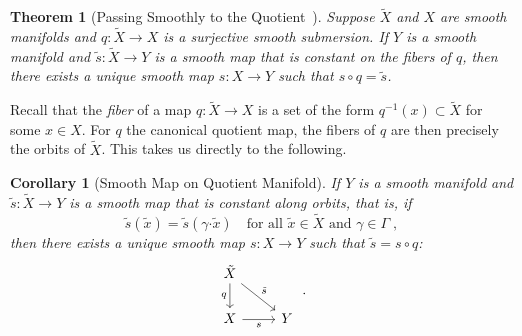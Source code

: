 \documentclass{article}
\newtheorem{corollary}{Corollary}
\newtheorem{theorem}{Theorem}
\theoremstyle{definition}
\theoremstyle{remark}
\newcommand{\bscdot}{\boldsymbol{\cdot}}
\newcommand{\DI}{\tilde{X}}	%
\newcommand{\di}{\tilde{x}}	%
\newcommand{\MA}{X}	%
\newcommand{\MAp}{Y}	%
\begin{document}
\begin{theorem}[Passing Smoothly to the Quotient~\cite{lee}] \label{thm:passing}
 Suppose $\DI$ and $\MA$ are smooth manifolds and $q : \DI \to \MA$ is a surjective smooth submersion. If $\MAp$ is a smooth
 manifold and $\tilde{s} : \DI \to \MAp$ is a smooth map that is constant on the fibers of $q$, then there exists
a unique smooth map $s : \MA \to \MAp$ such that $s\circ q = \tilde{s}$.
\end{theorem}




Recall that the \emph{fiber} of a map $q : \DI \to \MA$ is a set of the form $q^{-1}(x) \subset \DI$ for some $x \in \MA$.
For $q$ the canonical quotient map, the fibers of $q$ are then precisely the orbits of $\DI$. This takes us directly to the following.

\begin{corollary}[Smooth Map on Quotient Manifold] \label{cor:descend}
 If $\MAp$ is a smooth manifold and $\tilde{s} : \DI \to \MAp$ is a smooth map that is constant along orbits, that is, if
 \begin{equation} \label{eq:descend}
  \tilde{s}(\di) = \tilde{s}(\gamma\bscdot\di) \quad \text{for all $\di \in \DI$ and $\gamma \in \Gamma$} \;,
 \end{equation}
 then there exists a unique smooth map $s: \MA \to \MAp$ such that
 $\tilde{s} = s\circ q$:
 \begin{displaymath}
 \begin{tikzcd}
  \DI \arrow{d}[left]{q} \arrow{rd}{\tilde{s}} &  \\
                       \MA \arrow{r}[below]{s} & \MAp 
 \end{tikzcd} \;.
 \end{displaymath}
\end{corollary}
\end{document}
